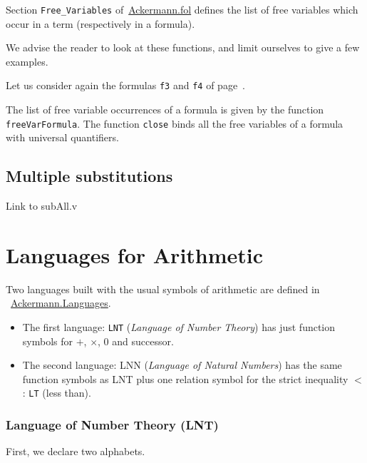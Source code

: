  
Section \texttt{Free\_Variables} 
of~\href{../theories/html/hydras.Ackermann.fol.html}{Ackermann.fol} defines the list of free variables which occur in a term (respectively in a formula).

We advise the reader to look at these functions, and limit ourselves to give a few examples.

Let us consider again the formulas \texttt{f3} and \texttt{f4} of page~\pageref{fol:examplesf1f2f3}.

The list of free variable occurrences of a formula is given by the function \texttt{freeVarFormula}. The function \texttt{close}
binds all the free variables of a formula with universal quantifiers.


\subsection{Multiple substitutions}

\begin{todo}
Link to subAll.v
\end{todo}

\section{Languages for Arithmetic}



Two languages built with the usual symbols of arithmetic are 
defined in ~\href{../theories/html/hydras.Ackermann.Languages.html}{Ackermann.Languages}.

\begin{itemize}
\item The first language: \texttt{LNT} (\emph{Language of Number Theory}) has just function symbols for $+$, $\times$, $0$ and successor.
\item The second language: LNN (\emph{Language of Natural Numbers})  has
the same function symbols as LNT plus one relation symbol for the strict inequality $<$ : \texttt{LT} (less than).
\end{itemize}

\subsubsection{Language of Number Theory (LNT)}

First, we declare two alphabets.


